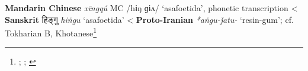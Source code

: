 \begin{etymology}\label{ety:xingqu}
\textbf{Mandarin Chinese}  \textit{xīngqú} MC /hɨŋ ɡɨʌ/ `asafoetida', phonetic transcription
< \textbf{Sanskrit} {हिङ्गु} \textit{hiṅgu} `asafoetida'
< \textbf{Proto-Iranian} \textit{*aṅgu-ǰatu-} `resin-gum'; cf. Tokharian B, Khotanese\footnote{\textcite{leung_itinerary_2019}; \textcite[353]{laufer_sino-iranica_1919}; \textcite[7]{adams_dictionary_2013}}
\end{etymology}